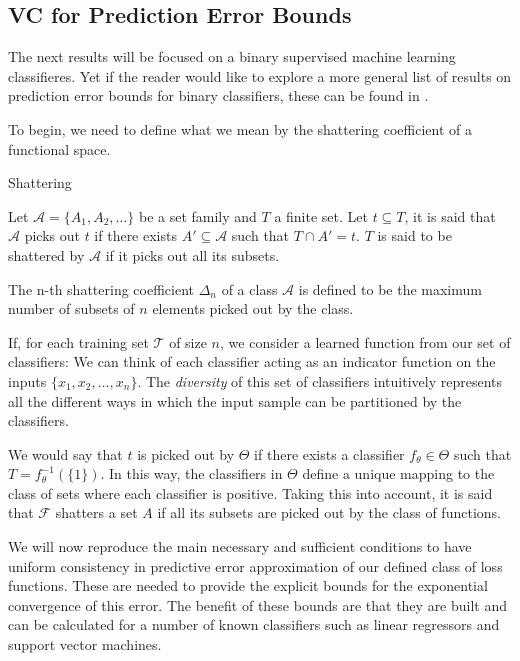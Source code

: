 \begin{appendices}
\subsection{VC for Prediction Error Bounds }\label{appx:sec:vcErrroBounds}

The next results will be focused on a binary supervised machine learning classifieres. Yet if the reader would like to explore a more general list of results on prediction error bounds for binary classifiers, these can be found in \textcite{cherkassky-learning2007}.

To begin, we need to define what we mean by the shattering coefficient of a functional space.

\begin{definition}{Shattering}

Let $\mathcal {A}= \{A_1,A_{2},\dots \}$ be a set family and $T$ a finite set.
Let $t \subseteq T$, it is said that $\mathcal {A}$ picks out $t$ if there exists $A' \subseteq \mathcal {A} $ such that $ T \cap A' = t$.
$T$ is said to be shattered by $\mathcal {A}$ if it picks out all its subsets.


\end{definition}

The n-th shattering coefficient $\Delta_n$ of a class $\mathcal {A}$ is defined to be the maximum number of subsets of $n$ elements picked out by the class.

If, for each training set $\mathcal {T}$ of size $n$, we consider a learned function from our set of classifiers:
We can think of each classifier acting as an indicator function on the inputs $\{ x_1,x_2,\ldots,x_n \}$.
The \textit{diversity} of this set of classifiers intuitively represents all the different ways in which the input sample can be partitioned by the classifiers.

We would say that $t$ is picked out by $\Theta$ if there exists a classifier $f_{\theta} \in \Theta$ such that $T = f_{\theta}^{-1}(\{1\})$.
In this way, the classifiers in $\Theta$ define a unique mapping to the class of sets where each classifier is positive.
Taking this into account, it is said that $\mathcal {F}$ shatters a set $A$ if all its subsets are picked out by the class of functions.

We will now reproduce the main necessary and sufficient conditions to have uniform consistency in predictive error approximation of our defined class of loss functions.
These are needed to provide the explicit bounds for the exponential convergence of this error.
The benefit of these bounds are that they are built and can be calculated for a number of known classifiers such as linear regressors and support vector machines.



\end{appendices}
